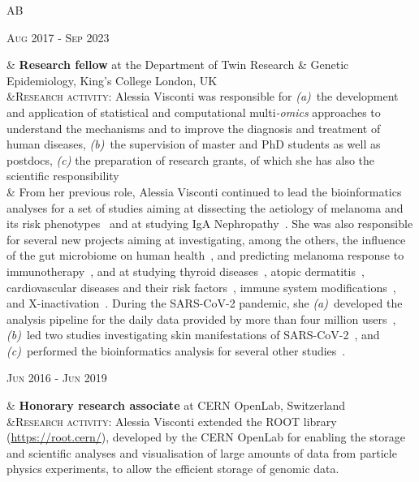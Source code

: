 \documentclass[a4paper,10pt]{article}
\newenvironment{doubletablelist}
{
	\vspace{-0.2cm}
	\begin{longtable}[!h]{AB}}{\end{longtable}
}
\newcommand{\dtlist}[2]{
\hspace{-3cm}
\noindent
	\begin{minipage}{0.22\textwidth}
	\begin{flushright}
	\textsc{#1}
	\end{flushright}
	\end{minipage}
	& #2\\[0.2cm]
}
\begin{document}
\begin{doubletablelist}
	\dtlist{Aug 2017 - Sep 2023}{\textbf{Research fellow} at the Department of Twin Research \& Genetic Epidemiology, King's College London, UK \\	
	 &\textsc{Research activity}: Alessia Visconti was responsible for \emph{(a)}~the development and application of statistical and computational multi\emph{-omics} approaches to understand the mechanisms and to improve the diagnosis and treatment of human diseases, \emph{(b)}~the supervision of master and PhD students as well as postdocs, \emph{(c)} the preparation of research grants, of which she has also the scientific responsibility\\
	  & From her previous role, Alessia Visconti continued to lead the bioinformatics analyses for a set of studies aiming at dissecting the aetiology of melanoma and its risk phenotypes~\cite{Vis19a,Vis20,Lan20,San20} and at studying IgA Nephropathy~\cite{Dot21}. She was also responsible for several new projects aiming at investigating, among the others, the influence of the gut microbiome on human health~\cite{Vis19,Bar20,LeR22,Zha22,Val23,Lou23,Nog23a,Nog23b}, and predicting melanoma response to immunotherapy~\cite{Ros22,Vis23}, and at studying thyroid diseases~\cite{Mar20}, atopic dermatitis~\cite{Gro21,Bud22}, cardiovascular diseases and their risk factors~\cite{Ros21}, immune system modifications~\cite{Pia21}, and X-inactivation~\cite{Zit23}. During the SARS-CoV-2 pandemic, she \emph{(a)}~developed the analysis pipeline for the daily data provided by more than four million users~\cite{Mur21}, \emph{(b)}~led two studies investigating skin manifestations of SARS-CoV-2~\cite{Vis21, Vis22}, and \emph{(c)}~performed the bioinformatics analysis for several other studies~\cite{Men20,Lee20,Zaz20,Hop21,Wil21,Sud21}. %
	}
	
	
    \dtlist{Jun 2016 - Jun 2019}{\textbf{Honorary research associate} at CERN OpenLab, Switzerland \\
	 &\textsc{Research activity}: Alessia Visconti extended the ROOT library (\url{https://root.cern/}), developed by the CERN OpenLab for enabling the storage and scientific analyses and visualisation of large amounts of data from particle physics experiments, to allow the efficient storage of genomic data. %
	}
    

\end{doubletablelist}
\end{document}
